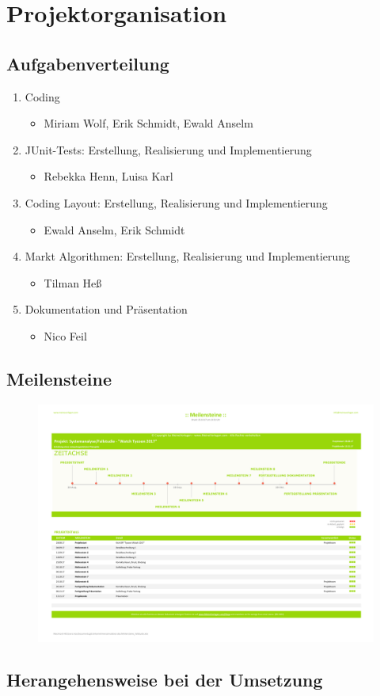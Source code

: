 \clearpage
\chapter{Projektorganisation}
\section{Aufgabenverteilung}
\begin{enumerate}
	\item Coding
	\begin{itemize}
		\item Miriam Wolf, Erik Schmidt, Ewald Anselm
	\end{itemize} 
	\item JUnit-Tests: Erstellung, Realisierung und Implementierung
	\begin{itemize}
		\item Rebekka Henn, Luisa Karl
	\end{itemize} 
	\item Coding Layout: Erstellung, Realisierung und Implementierung
	\begin{itemize}
		\item Ewald Anselm, Erik Schmidt
	\end{itemize} 
	\item Markt Algorithmen: Erstellung, Realisierung und Implementierung
	\begin{itemize}
		\item Tilman Heß
	\end{itemize} 	
	\item Dokumentation und Präsentation
	\begin{itemize}
	\item Nico Feil
	\end{itemize}
\end{enumerate}
\clearpage
\section{Meilensteine}
\begin{figure}[!h]
	\centering
	\includegraphics[angle=90, scale=0.47]{img/Meilensteine_Fallstudie.pdf} 
\end{figure}
\section{Herangehensweise bei der Umsetzung}